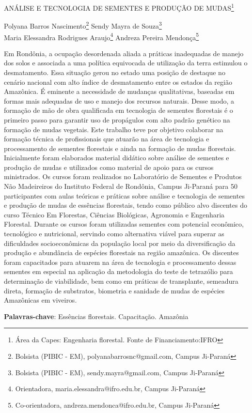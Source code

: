 \documentclass[article,12pt,onesidea,4paper,english,brazil]{abntex2}
\begin{document}
	
	
	\frenchspacing 
	
	\begin{center}
		\LARGE ANÁLISE E TECNOLOGIA DE SEMENTES E PRODUÇÃO DE MUDAS\footnote{Área da Capes: Engenharia florestal. Fonte de Financiamento:IFRO}
		
		\normalsize
		Polyana Barros Nascimento\footnote{Bolsista (PIBIC - EM), polyanabarrosnc@gmail.com, Campus Ji-Paraná} 
		Sendy Mayra de Souza\footnote{Bolsista (PIBIC - EM), sendy.mayra@gmail.com, Campus Ji-Paraná} \\
		Maria Elessandra Rodrigues Araujo\footnote{Orientadora, maria.elessandra@ifro.edu.br, Campus Ji-Paraná} 
		Andreza Pereira Mendonça\footnote{Co-orientadora, andreza.mendonca@ifro.edu.br, Campus Ji-Paraná} 
	\end{center}
	
	\noindent Em Rondônia, a ocupação desordenada aliada a práticas inadequadas de manejo dos solos e associada a uma política equivocada de utilização da terra estimulou o desmatamento. Essa situação gerou no estado uma posição de destaque no cenário nacional com alto índice de desmatamento entre os estados da região Amazônica. É eminente a necessidade de mudanças qualitativas, baseadas em formas mais adequadas de uso e manejo dos recursos naturais. Desse modo, a formação de mão de obra qualificada em tecnologia de sementes florestais é o primeiro passo para garantir uso de propágulos com alto padrão genético na formação de mudas vegetais.  Este trabalho teve por objetivo colaborar na formação técnica de profissionais que atuarão na área de tecnologia e processamento de sementes florestais e ainda na formação de mudas florestais. Inicialmente foram elaborados material didático sobre análise de sementes e produção de mudas e utilizados como material de apoio para os cursos ministrados. Os cursos foram realizados no Laboratório de Sementes e Produtos Não Madeireiros do Instituto Federal de Rondônia, Campus Ji-Paraná para 50 participantes com aulas teóricas e práticas sobre análise e tecnologia de sementes e produção de mudas de essências florestais, tendo como público alvo discentes do curso Técnico Em Florestas, Ciências Biológicas, Agronomia e Engenharia Florestal. Durante os cursos foram utilizadas sementes com potencial econômico, tecnológico e nutricional, servindo como alternativa viável para superar as dificuldades socioeconômicas da população local por meio da diversificação da produção e abundância de espécies florestais na região amazônica. Os discentes foram capacitados para atuarem na área de tecnologia e processamento dessas sementes em especial na aplicação da metodologia do teste de tetrazólio para determinação de viabilidade, bem como em práticas de transplante, semeadura direta, formação de substratos, biometria e sanidade de mudas de espécies Amazônicas em viveiros.
	
	\vspace{\onelineskip}
	
	\noindent
	\textbf{Palavras-chave}: Essências florestais. Capacitação. Amazônia
	
\end{document}
